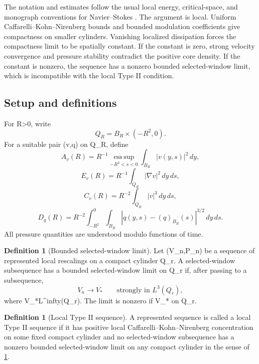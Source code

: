 \documentclass[11pt]{amsart}
\def\({}%
\def\){}%
\def\infty{infty}%
\theoremstyle{plain}
\theoremstyle{definition}
\newtheorem{definition}[theorem]{Definition}
\theoremstyle{remark}
\begin{document}
The notation and estimates follow the usual local energy, critical-space, and
monograph conventions for Navier--Stokes
\cite{Ladyzhenskaya1969,Temam1977,ConstantinFoias1988,Kato1984,EscauriazaSereginSverak2003,LemarieRieusset2002}.
The argument is local.  Uniform Caffarelli--Kohn--Nirenberg bounds and bounded
modulation coefficients give compactness on smaller cylinders.  Vanishing
localized dissipation forces the compactness limit to be spatially constant.
If the constant is zero, strong velocity convergence and pressure stability
contradict the positive core density.  If the constant is nonzero, the sequence
has a nonzero bounded selected-window limit, which is incompatible with the
local Type II condition.

\subsection{Setup and definitions}

For \(R>0\), write
\[
  Q_R=B_R\times(-R^2,0).
\]
For a suitable pair \((v,q)\) on \(Q_R\), define
\[
  A_v(R)=R^{-1}\operatorname*{ess\,sup}_{-R^2<s<0}
  \int_{B_R}|v(y,s)|^2\,dy,
\]
\[
  E_v(R)=R^{-1}\int_{Q_R}|\nabla v|^2\,dy\,ds,
\]
\[
  C_v(R)=R^{-2}\int_{Q_R}|v|^3\,dy\,ds,
\]
\[
  D_q(R)=R^{-2}\int_{-R^2}^0\int_{B_R}
  |q(y,s)-(q)_{B_R}(s)|^{3/2}\,dy\,ds.
\]
All pressure quantities are understood modulo functions of time.

\begin{definition}[Bounded selected-window limit]\label{paper1:def:bounded-window-limit}
Let \((V_n,P_n)\) be a sequence of represented local rescalings on a compact
cylinder \(Q_r\).  A selected-window subsequence has a bounded selected-window limit
on \(Q_r\) if, after passing to a subsequence,
\[
  V_n\to V_*
  \qquad\text{strongly in }L^3(Q_r),
\]
where \(V_*\in L^\infty(Q_r)\).  The limit is nonzero if
\(V_*\not{}\) on \(Q_r\).
\end{definition}

\begin{definition}[Local Type II sequence]\label{paper1:def:typeII}
A represented sequence is called a local Type II sequence if it has positive
local Caffarelli--Kohn--Nirenberg concentration on some fixed compact cylinder
and no selected-window subsequence has a nonzero bounded selected-window limit on
any compact cylinder in the sense of \cref{paper1:def:bounded-window-limit}.
\end{definition}
\end{document}
